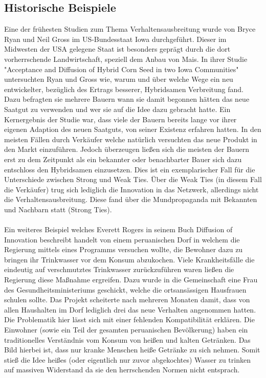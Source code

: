 \documentclass[12pt]{article}
\begin{document}
\subsection{Historische Beispiele}
Eine der frühesten Studien zum Thema Verhaltensausbreitung wurde von Bryce Ryan und Neil Gross im US-Bundesstaat Iowa durchgeführt. Dieser im Midwesten der USA gelegene Staat ist besonders geprägt durch die dort vorherrschende Landwirtschaft, speziell dem Anbau von Mais. In ihrer Studie "Acceptance and Diffusion of Hybrid Corn Seed in two Iowa Communities" \cite{Ryan43} untersuchten Ryan und Gross wie, warum und über welche Wege ein neu entwickelter, bezüglich des Ertrags besserer, Hybridsamen Verbreitung fand. Dazu befragten sie mehrere Bauern wann sie damit begonnen hätten das neue Saatgut zu verwenden und wer sie auf die Idee dazu gebracht hatte. Ein Kernergebnis der Studie war, dass viele der Bauern bereits lange vor ihrer eigenen Adaption des neuen Saatguts, von seiner Existenz erfahren hatten. In den meisten Fällen durch Verkäufer welche natürlich versuchten das neue Produkt in den Markt einzuführen. Jedoch überzeugen ließen sich die meisten der Bauern erst zu dem Zeitpunkt als ein bekannter oder benachbarter Bauer sich dazu entschloss den Hybridsamen einzusetzen. Dies ist ein exemplarischer Fall für die Unterschiede zwischen Strong und Weak Ties. Über die Weak Ties (in diesem Fall die Verkäufer) trug sich lediglich die Innovation in das Netzwerk, allerdings nicht die Verhaltensausbreitung. Diese fand über die Mundpropaganda mit Bekannten und Nachbarn statt (Strong Ties). \\\\
Ein weiteres Beispiel welches Everett Rogers in seinem Buch Diffusion of Innovation beschreibt handelt von einem peruanischen Dorf in welchem die Regierung mittels eines Programms versuchen wollte, die Bewohner dazu zu bringen ihr Trinkwasser vor dem Konsum abzukochen. Viele Krankheitsfälle die eindeutig auf verschmutztes Trinkwasser zurückzuführen waren ließen die Regierung diese Maßnahme ergreifen. Dazu wurde in die Gemeinschaft eine Frau des Gesundheitsministeriums geschickt, welche die ortsansässigen Hausfrauen schulen sollte. Das Projekt scheiterte nach mehreren Monaten damit, dass von allen Haushalten im Dorf lediglich drei das neue Verhalten angenommen hatten. Die Problematik hier lässt sich mit einer fehlenden Kompatibilität erklären. Die Einwohner (sowie ein Teil der gesamten peruanischen Bevölkerung) haben ein traditionelles Verständnis vom Konsum von heißen und kalten Getränken. Das Bild hierbei ist, dass nur kranke Menschen heiße Getränke zu sich nehmen. Somit stieß die Idee heißes (oder eigentlich nur zuvor abgekochtes) Wasser zu trinken auf massiven Widerstand da sie den herrschenden Normen nicht entsprach.
\end{document}
